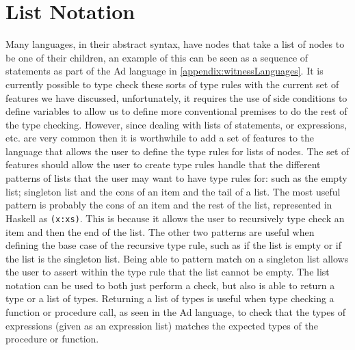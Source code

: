 \section{List Notation}
Many languages, in their abstract syntax, have nodes that take a list of nodes to be one of their children, an example of this can be seen as a sequence of statements as part of the Ad language in \autoref{appendix:witnessLanguages}.
It is currently possible to type check these sorts of type rules with the current set of features we have discussed, unfortunately, it requires the use of side conditions to define variables to allow us to define more conventional premises to do the rest of the type checking.
However, since dealing with lists of statements, or expressions, etc. are very common then it is worthwhile to add a set of features to the language that allows the user to define the type rules for lists of nodes.
The set of features should allow the user to create type rules handle that the different patterns of lists that the user may want to have type rules for: such as the empty list; singleton list and the cons of an item and the tail of a list.
The most useful pattern is probably the cons of an item and the rest of the list, represented in Haskell as \texttt{(x:xs)}.
This is because it allows the user to recursively type check an item and then the end of the list.
The other two patterns are useful when defining the base case of the recursive type rule, such as if the list is empty or if the list is the singleton list.
Being able to pattern match on a singleton list allows the user to assert within the type rule that the list cannot be empty.
The list notation can be used to both just perform a check, but also is able to return a type or a list of types.
Returning a list of types is useful when type checking a function or procedure call, as seen in the Ad language, to check that the types of expressions (given as an expression list) matches the expected types of the procedure or function.

